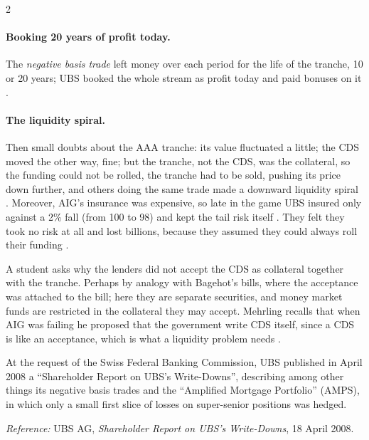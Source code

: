 \begin{paracol}{2}
\paragraph{Booking 20 years of profit today.} The \emph{negative basis trade} left money over each period for the life of the tranche, 10 or 20 years; UBS booked the
whole stream as profit today and paid bonuses on it .

\paragraph{The liquidity spiral.} Then small doubts about the AAA tranche: its value fluctuated a little; the CDS moved the other way, fine; but the tranche, not the
CDS, was the collateral, so the funding could not be rolled, the tranche had to be sold, pushing its price down further, and others doing the same trade made a
downward liquidity spiral . Moreover, AIG's insurance was expensive, so late in the game UBS insured
only against a 2\% fall (from 100 to 98) and kept the tail risk itself . They felt they took no risk at all and lost
billions, because they assumed they could always roll their funding .

\begin{coursenote}
A student asks why the lenders did not accept the CDS as collateral together with the tranche. Perhaps by analogy with Bagehot's bills, where the acceptance was
attached to the bill; here they are separate securities, and money market funds are restricted in the collateral they may accept. Mehrling recalls that when AIG
was failing he proposed that the government write CDS itself, since a CDS is like an acceptance, which is what a liquidity problem needs
.
\end{coursenote}

\begin{history}
At the request of the Swiss Federal Banking Commission, UBS published in April 2008 a ``Shareholder Report on UBS's Write-Downs'', describing among other things its
negative basis trades and the ``Amplified Mortgage Portfolio'' (AMPS), in which only a small first slice of losses on super-senior positions was hedged.\par
\emph{Reference:} UBS AG, \emph{Shareholder Report on UBS's Write-Downs}, 18 April 2008.
\end{history}


\end{paracol}
